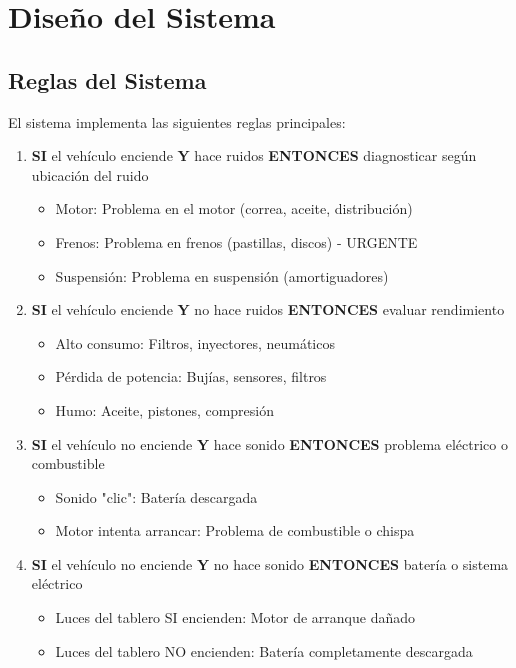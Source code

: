 \documentclass[12pt]{article}
\begin{document}
\section{Diseño del Sistema}

\subsection{Reglas del Sistema}

El sistema implementa las siguientes reglas principales:

\begin{enumerate}
    \item \textbf{SI} el vehículo enciende \textbf{Y} hace ruidos \textbf{ENTONCES} diagnosticar según ubicación del ruido
    \begin{itemize}
        \item Motor: Problema en el motor (correa, aceite, distribución)
        \item Frenos: Problema en frenos (pastillas, discos) - URGENTE
        \item Suspensión: Problema en suspensión (amortiguadores)
    \end{itemize}
    
    \item \textbf{SI} el vehículo enciende \textbf{Y} no hace ruidos \textbf{ENTONCES} evaluar rendimiento
    \begin{itemize}
        \item Alto consumo: Filtros, inyectores, neumáticos
        \item Pérdida de potencia: Bujías, sensores, filtros
        \item Humo: Aceite, pistones, compresión
    \end{itemize}
    
    \item \textbf{SI} el vehículo no enciende \textbf{Y} hace sonido \textbf{ENTONCES} problema eléctrico o combustible
    \begin{itemize}
        \item Sonido "clic": Batería descargada
        \item Motor intenta arrancar: Problema de combustible o chispa
    \end{itemize}
    
    \item \textbf{SI} el vehículo no enciende \textbf{Y} no hace sonido \textbf{ENTONCES} batería o sistema eléctrico
    \begin{itemize}
        \item Luces del tablero SI encienden: Motor de arranque dañado
        \item Luces del tablero NO encienden: Batería completamente descargada
    \end{itemize}
\end{enumerate}
\end{document}
